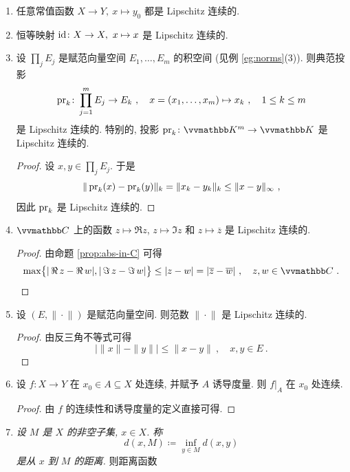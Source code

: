 \begin{example}
\begin{enumerate}
\begin{proof}
\[            \]
            因此 \(f\) 在 \(x_0\) 处连续. 注意到, 在这种情况下, \(\delta\) 的选择与 \(x_0\) 无关.
        \end{proof}
        \item 任意常值函数 \(X \to Y,\ x \mapsto y_0 \) 都是 Lipschitz 连续的.
        \item 恒等映射 \(\operatorname{id} \colon X \to X,\ x \mapsto x\) 是 Lipschitz 连续的.
        \item 设 \(\prod_j E_j\) 是赋范向量空间 \(E_1, \ldots, E_m\) 的积空间 (见例 \ref{eg:norms}(3)). 则典范投影
        \[
            \operatorname{pr}_k \colon \prod_{j = 1}^m E_j \to E_k\ ,\quad x = (x_1, \ldots, x_m) \mapsto x_k\ ,\quad 1 \leq k \leq m
        \]
        是 Lipschitz 连续的. 特别的, 投影 \(\pr_k \colon \K^m \to \K\) 是 Lipschitz 连续的.
        \begin{proof}
            设 \(x, y \in \prod_j E_j\). 于是
            \[
                \|\operatorname{pr}_k(x) - \operatorname{pr}_k(y)\|_k = \|x_k - y_k\|_k \leq \|x - y\|_\infty\ ,
            \]
            因此 \(\operatorname{pr}_k\) 是 Lipschitz 连续的.
        \end{proof}
        \item \(\C\) 上的函数 \(z \mapsto \Re z\), \(z \mapsto \Im z\) 和 \(z \mapsto \overline z\) 是 Lipschitz 连续的.
        \begin{proof}
            由命题 \ref{prop:abs-in-C} 可得
            \[
                \max \bigl\{|\Re z - \Re w|, |\Im z - \Im w|\bigr\} \leq |z - w| = |\overline z - \overline w|\ ,\quad z, w \in \C\ .
            \]
        \end{proof}
        \item 设 \((E, \|\!\cdot\!\|)\) 是赋范向量空间. 则范数 \(\|\!\cdot\!\|\) 是 Lipschitz 连续的.
        \begin{proof}
            由反三角不等式可得
            \[
                \bigl|\|x\| - \|y\|\bigr| \leq \|x - y\|\ ,\quad x, y \in E\ .
            \]
        \end{proof}
        \item 设 \(f \colon X \to Y\) 在 \(x_0 \in A \subseteq X\) 处连续, 并赋予 \(A\) 诱导度量. 则 \(f|_A\) 在 \(x_0\) 处连续.
        \begin{proof}
            由 \(f\) 的连续性和诱导度量的定义直接可得.
        \end{proof}
        \item \textsl{设 \(M\) 是 \(X\) 的非空子集, \(x \in X\). 称
        \[
            d(x, M) \coloneqq \inf_{y \in M} d(x, y)
        \]
        是从 \(x\) 到 \(M\) 的距离.} 则距离函数

\end{enumerate}
\end{example}
